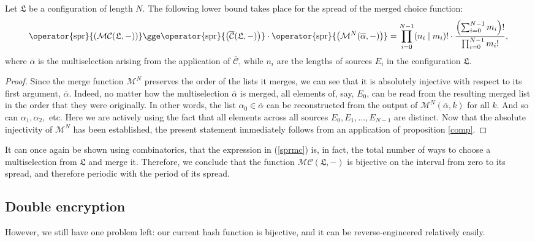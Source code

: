 \documentclass[12pt, a4paper]{article}
\renewcommand{\C}{\mathcal{C}}
\newcommand{\CC}{\overline{\mathcal{C}}}
\newcommand{\M}{\mathcal{M}}
\newcommand{\conf}{\mathfrak{L}}
\newcommand{\spr}[1]{\operator{\mathrm{spr}}{\left(#1\right)}}
\begin{document}
\begin{proposition}
    Let $ \conf $ be a configuration of length $ N $. The following lower bound takes place for the spread of the merged choice function:
    \begin{equation}\label{sprmc}
        \spr{\M\C(\conf, -)} \gge \spr{\CC(\conf, -)} \cdot \spr{\M^N(\overline{\alpha}, -)} = \prod\limits_{i = 0}^{N-1} (n_i \mid m_i)! \cdot \frac{\left( \sum\nolimits_{i = 0}^{N-1} m_i \right)!}{\prod\nolimits_{i = 0}^{N-1} m_i!},
    \end{equation}
    where $ \overline{\alpha} $ is the multiselection arising from the application of $ \CC $, while $ n_i $ are the lengths of sources $ E_i $ in the configuration $ \conf $.
\end{proposition}
\begin{proof}
    Since the merge function $ \M^N $ preserves the order of the lists it merges, we can see that it is absolutely injective with respect to its first argument, $ \overline{\alpha} $. Indeed, no matter how the multiselection $ \overline{\alpha} $ is merged, all elements of, say, $ E_0 $, can be read from the resulting merged list in the order that they were originally. In other words, the list $ \alpha_0 \in \overline{\alpha} $ can be reconstructed from the output of $ \M^N(\overline{\alpha}, k) $ for all $ k $. And so can $ \alpha_1, \alpha_2, $ etc. Here we are actively using the fact that all elements across all sources $ E_0, E_1, ..., E_{N-1} $ are distinct. Now that the absolute injectivity of $ \M^N $ has been established, the present statement immediately follows from an application of proposition \ref{comp}.
\end{proof}

It can once again be shown using combinatorics, that the expression in (\ref{sprmc}) is, in fact, the total number of ways to choose a multiselection from $ \conf $ and merge it. Therefore, we conclude that the function $ \M\C(\conf, -) $ is bijective on the interval from zero to its spread, and therefore periodic with the period of its spread.

\subsection{Double encryption}

However, we still have one problem left: our current hash function is bijective, and it can be reverse-engineered relatively easily.
\end{document}
